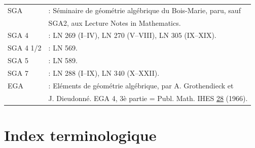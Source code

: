 \documentclass[12pt,a4paper]{article}
\theoremstyle{plain}
\theoremstyle{definition}
\theoremstyle{remark}
\begin{document}
\begin{tabular}{ll}
SGA & : S\'eminaire de g\'eom\'etrie alg\'ebrique du Bois-Marie, paru, sauf \\ & \quad SGA2, aux Lecture Notes in Mathematics. \\[6pt]
SGA 4 & : LN 269 (I--IV), LN 270 (V--VIII), LN 305 (IX--XIX). \\[6pt]
SGA 4 1/2 & : LN 569. \\[6pt]
SGA 5 & : LN 589. \\[6pt]
SGA 7 & : LN 288 (I--IX), LN 340 (X--XXII). \\[12pt]
EGA & : El\'ements de g\'eom\'etrie alg\'ebrique, par A. Grothendieck et \\ & \quad J. Dieudonn\'e. EGA 4, 3\`e partie = Publ. Math. IHES \underline{28} (1966).
\end{tabular}

\newpage
\section*{Index terminologique}
\end{document}
